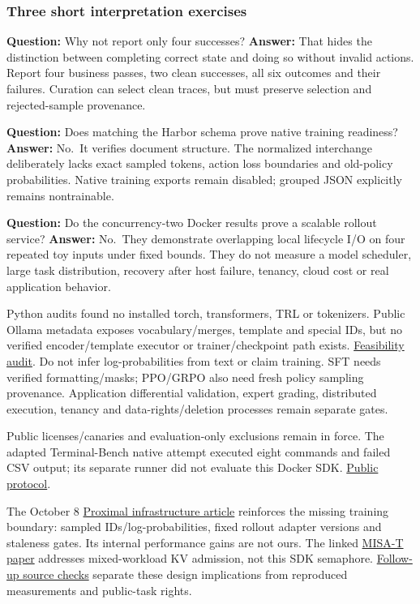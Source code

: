 \documentclass[
  11pt,
  letterpaper,
]{article}
\begin{document}
\subsubsection{Three short interpretation
exercises}\label{three-short-interpretation-exercises}

\textbf{Question:} Why not report only four successes? \textbf{Answer:}
That hides the distinction between completing correct state and doing so
without invalid actions. Report four business passes, two clean
successes, all six outcomes and their failures. Curation can select
clean traces, but must preserve selection and rejected-sample
provenance.

\textbf{Question:} Does matching the Harbor schema prove native training
readiness? \textbf{Answer:} No.~It verifies document structure. The
normalized interchange deliberately lacks exact sampled tokens, action
loss boundaries and old-policy probabilities. Native training exports
remain disabled; grouped JSON explicitly remains nontrainable.

\textbf{Question:} Do the concurrency-two Docker results prove a
scalable rollout service? \textbf{Answer:} No.~They demonstrate
overlapping local lifecycle I/O on four repeated toy inputs under fixed
bounds. They do not measure a model scheduler, large task distribution,
recovery after host failure, tenancy, cloud cost or real application
behavior.

Python audits found no installed torch, transformers, TRL or tokenizers.
Public Ollama metadata exposes vocabulary/merges, template and special
IDs, but no verified encoder/template executor or trainer/checkpoint
path exists. \href{../trainer-preprocessing-feasibility.md}{Feasibility
audit}. Do not infer log-probabilities from text or claim training. SFT
needs verified formatting/masks; PPO/GRPO also need fresh policy
sampling provenance. Application differential validation, expert
grading, distributed execution, tenancy and data-rights/deletion
processes remain separate gates.

Public licenses/canaries and evaluation-only exclusions remain in force.
The adapted Terminal-Bench native attempt executed eight commands and
failed CSV output; its separate runner did not evaluate this Docker SDK.
\href{../public-benchmark.md}{Public protocol}.

The October 8
\href{https://www.proximal.so/blog/posttraining-infra/}{Proximal
infrastructure article} reinforces the missing training boundary:
sampled IDs/log-probabilities, fixed rollout adapter versions and
staleness gates. Its internal performance gains are not ours. The linked
\href{https://arxiv.org/abs/2608.11152v1}{MISA-T paper} addresses
mixed-workload KV admission, not this SDK semaphore.
\href{../research/FOLLOWUP-SOURCES.md}{Follow-up source checks} separate
these design implications from reproduced measurements and public-task
rights.
\end{document}
